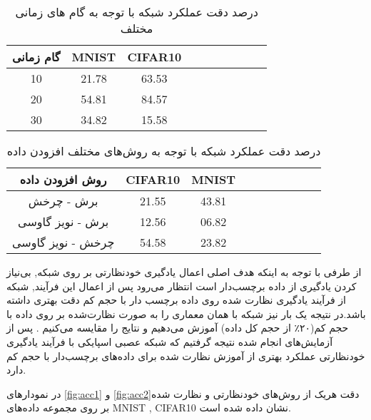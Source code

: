 \begin{table}[h!]
	\centering
	\begin{tabular}{|c |c c| rrrrrrr}
		\hline
		گام زمانی & MNIST & CIFAR10    \\ 
		\hline
		10   & 21.78     &63.53    \\
		20    & 54.81     & 84.57     \\
		30   & 34.82    & 15.58         \\
		\hline
		
	\end{tabular}
	\captionsetup{font=small} %
	\caption{درصد دقت عملکرد شبکه با توجه به گام های زمانی مختلف}
\end{table}


\begin{table}[h!]
	\centering
	\begin{tabular}{|c |c c| rrrrrrr}
		\hline
		روش افزودن داده & CIFAR10& MNIST     \\ 
		\hline
		برش - چرخش   & 21.55      &43.81     \\
		برش - نویز گاوسی    & 12.56     & 06.82      \\
		چرخش - نویز گاوسی   & 54.58     & 23.82          \\
		\hline
		
	\end{tabular}
	\captionsetup{font=small} %
	\caption{درصد دقت عملکرد شبکه با توجه به روش‌های مختلف افزودن داده}
\end{table}






از طرفی با توجه به اینکه هدف اصلی اعمال یادگیری خودنظارتی بر روی شبکه, بی‌نیاز کردن یادگیری از داده برچسب‌دار است انتظار می‌رود پس از اعمال این فرآیند, شبکه از فرآیند یادگیری نظارت شده روی داده برچسب دار با حجم کم دقت بهتری داشته باشد.در نتیجه یک بار نیز شبکه با همان معماری را به صورت نظارت‌شده بر روی داده با حجم کم(۲۰٪ از حجم کل داده) آموزش می‌دهیم و نتایج را مقایسه می‌کنیم . 
پس از آزمایش‌های انجام شده نتیجه گرفتیم که شبکه عصبی اسپایکی با فرآیند یادگیری خودنظارتی عملکرد بهتری از آموزش نظارت شده برای داده‌های برچسب‌دار با حجم کم دارد.

در نمودارهای  \ref{fig:acc1} و  \ref{fig:acc2}دقت هریک از روش‌های خودنظارتی و نظارت شده بر روی مجموعه داده‌های MNIST , CIFAR10 نشان داده شده است.


